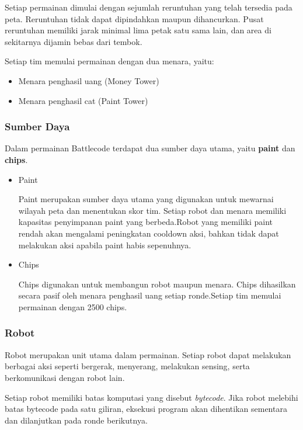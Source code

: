 Setiap permainan dimulai dengan sejumlah reruntuhan yang telah tersedia pada peta. Reruntuhan tidak dapat dipindahkan maupun dihancurkan. Pusat reruntuhan memiliki jarak minimal lima petak satu sama lain, dan area di sekitarnya dijamin bebas dari tembok.

Setiap tim memulai permainan dengan dua menara, yaitu:

\begin{itemize}
\item Menara penghasil uang (Money Tower)
\item Menara penghasil cat (Paint Tower)
\end{itemize}

\subsubsection{Sumber Daya}

Dalam permainan Battlecode terdapat dua sumber daya utama, yaitu \textbf{paint} dan \textbf{chips}.

\begin{itemize}
\item Paint

Paint merupakan sumber daya utama yang digunakan untuk mewarnai wilayah peta dan menentukan skor tim. Setiap robot dan menara memiliki kapasitas penyimpanan paint yang berbeda.Robot yang memiliki paint rendah akan mengalami peningkatan cooldown aksi, bahkan tidak dapat melakukan aksi apabila paint habis sepenuhnya.

\item Chips

Chips digunakan untuk membangun robot maupun menara. Chips dihasilkan secara pasif oleh menara penghasil uang setiap ronde.Setiap tim memulai permainan dengan 2500 chips.

\end{itemize}

\subsubsection{Robot}

Robot merupakan unit utama dalam permainan. Setiap robot dapat melakukan berbagai aksi seperti bergerak, menyerang, melakukan sensing, serta berkomunikasi dengan robot lain.

Setiap robot memiliki batas komputasi yang disebut \textit{bytecode}. Jika robot melebihi batas bytecode pada satu giliran, eksekusi program akan dihentikan sementara dan dilanjutkan pada ronde berikutnya.

